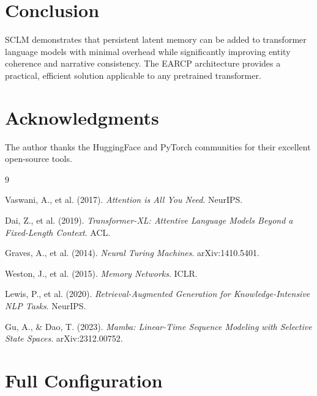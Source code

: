 \documentclass[11pt,a4paper]{article}
\begin{document}
\section{Conclusion}

SCLM demonstrates that persistent latent memory can be added to transformer language models with minimal overhead while significantly improving entity coherence and narrative consistency. The EARCP architecture provides a practical, efficient solution applicable to any pretrained transformer.

\section*{Acknowledgments}

The author thanks the HuggingFace and PyTorch communities for their excellent open-source tools.

\begin{thebibliography}{9}

Vaswani, A., et al. (2017).
\textit{Attention is All You Need}.
NeurIPS.

Dai, Z., et al. (2019).
\textit{Transformer-XL: Attentive Language Models Beyond a Fixed-Length Context}.
ACL.

Graves, A., et al. (2014).
\textit{Neural Turing Machines}.
arXiv:1410.5401.

Weston, J., et al. (2015).
\textit{Memory Networks}.
ICLR.

Lewis, P., et al. (2020).
\textit{Retrieval-Augmented Generation for Knowledge-Intensive NLP Tasks}.
NeurIPS.

Gu, A., \& Dao, T. (2023).
\textit{Mamba: Linear-Time Sequence Modeling with Selective State Spaces}.
arXiv:2312.00752.

\end{thebibliography}

\appendix
\section{Full Configuration}
\end{document}
